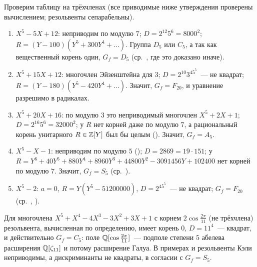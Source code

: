 \begin{example}[4.18g]
Проверим таблицу  на трёхчленах (все приводимые ниже утверждения проверены вычислением; резольвенты
сепарабельны).
\begin{enumerate}[label=(\arabic*),leftmargin=*]
\item $X^5-5X+12$: неприводим по модулю $7$; $D=2^{12}5^6=8000^2$; $R=(Y-100)(Y^5+300Y^4+\dots)$. Группа $D_5$ или $C_5$, а так
как вещественный корень один, $G_f=D_5$ (ср.\ , где это доказано иначе).
\item $X^5+15X+12$: многочлен Эйзенштейна для $3$; $D=2^{10}3^45^5$~--- не квадрат; $R=(Y-180)(Y^5-420Y^4+\dots)$.
Значит, $G_f=F_{20}$, и уравнение разрешимо в радикалах.
\item $X^5+20X+16$: по модулю $3$ это неприводимый многочлен $X^5+2X+1$; $D=2^{16}5^6=32000^2$; у $R$ нет корней даже по
модулю $7$, а рациональный корень унитарного $R\in\mathbb Z[Y]$ был бы целым (). Значит, $G_f=A_5$.
\item $X^5-X-1$: неприводим по модулю $5$ (); $D=2869=19\cdot151$; у $R=Y^6+40Y^5+880Y^4+8960Y^3+44800Y^2-3091456Y+102400$
нет корней по модулю $7$. Значит, $G_f=S_5$ (ср.\ ).
\item $X^5-2$: $a=0$, $R=Y(Y^5-51200000)$, $D=2^45^5$~--- не квадрат; $G_f=F_{20}$ (ср.\ , ).
\end{enumerate}
Для многочлена $X^5+X^4-4X^3-3X^2+3X+1$ с корнем $2\cos\frac{2\pi}{11}$ (не трёхчлена) резольвента, вычисленная по
определению, имеет корень $0$, $D=11^4$~--- квадрат, и действительно $G_f=C_5$: поле $\mathbb Q[\cos\frac{2\pi}{11}]$~--- подполе
степени $5$ абелева расширения $\mathbb Q[\zeta_{11}]$ и потому расширение Галуа. В примерах  и  резольвенты Кэли
неприводимы, а дискриминанты не квадраты, в согласии с $G_f=S_5$.
\end{example}


